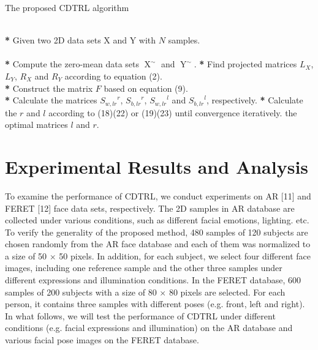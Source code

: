 \documentclass[journal]{IEEEtran}
\begin{document}
\begin{tiny}
\begin{algorithm}[]
\caption{The proposed CDTRL algorithm}
\label{alg:Framwork}
\begin{algorithmic}
\REQUIRE ~~\\
\textbf{*} Given two 2D data sets X and Y with $N$ samples.\\
\ENSURE ~~\\
\STATE \textbf{*} Compute the zero-mean data sets $\mathop X^{\sim}$ and $\mathop Y^{\sim}$.
\STATE \textbf{*} Find projected matrices ${L_X}$, ${L_Y}$, ${R_X}$ and ${R_Y}$ according to equation (2).\\
\STATE \textbf{*} Construct the matrix $F$ based on equation (9).\\
\STATE \textbf{*} Calculate the matrices ${S_{w, lr}}^r$, ${S_{b, lr}}^r$, ${S_{w, lr}}^l$ and ${S_{b, lr}}^l$, respectively.
\STATE \textbf{*} Calculate the $r$ and $l$ according to (18)(22) or (19)(23) until convergence iteratively.
\RETURN the optimal matrices $l$ and $r$.
\end{algorithmic}
\end{algorithm}
\end{tiny}
\section{Experimental Results and Analysis}
To examine the performance of CDTRL, we conduct experiments on AR [11] and FERET [12] face data sets, respectively. The 2D samples in AR database are collected under various conditions, such as different facial emotions, lighting. etc. To verify the generality of the proposed method, 480 samples of 120 subjects are chosen randomly from the AR face database and each of them was normalized to a size of 50 $\times$ 50 pixels. In addition, for each subject, we select four different face images, including one reference sample and the other three samples under different expressions and illumination conditions. %
In the FERET database, 600 samples of 200 subjects with a size of 80 $\times$ 80 pixels are selected. For each person, it contains three samples with different poses (e.g. front, left and right). %
In what follows, we will test the performance of CDTRL under different conditions (e.g. facial expressions and illumination) on the AR database and various facial pose images on the FERET database.
\end{document}
